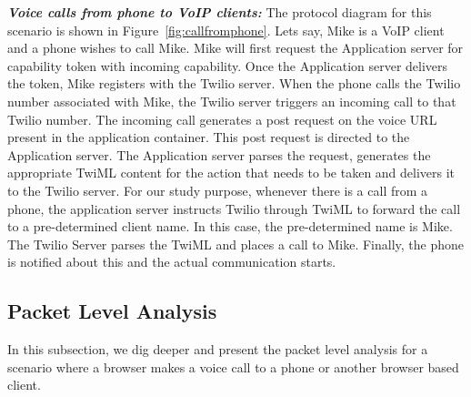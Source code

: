 \emph{\textbf{Voice calls from phone to VoIP clients:} }
The protocol diagram for this scenario is shown in Figure~\ref{fig:callfromphone}. Lets say, Mike is a VoIP client and a phone wishes to call Mike. Mike will first request the Application server for capability token with incoming capability. Once the Application server delivers the token, Mike registers with the Twilio server. When the phone calls the Twilio number associated with Mike, the Twilio server triggers an incoming call to that Twilio number. The incoming call generates a post request on the voice URL present in the application container. This post request is directed to the Application server. The Application server parses the request, generates the appropriate TwiML content for the action that needs to be taken and delivers it to the Twilio server. For our study purpose, whenever there is a call from a phone, the application server instructs Twilio through TwiML to forward the call to a pre-determined client name. In this case, the pre-determined name is Mike. The Twilio Server parses the TwiML and places a call to Mike. Finally, the phone is notified about this and the actual communication starts.

\subsection{Packet Level Analysis}
In this subsection, we dig deeper and present the packet level analysis for a scenario where a browser makes a voice call to a phone or another browser based client. 

